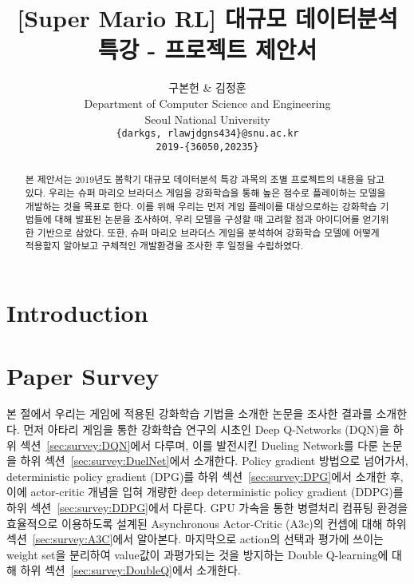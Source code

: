 \documentclass[10pt]{article}
\begin{document}
\title{[Super Mario RL] 대규모 데이터분석 특강 - 프로젝트 제안서}

\author{
구본헌 \& 김정훈\\
Department of Computer Science and Engineering\\
Seoul National University\\
\texttt{\{darkgs, rlawjdgns434\}@snu.ac.kr}\\
\texttt{2019-\{36050,20235\}}\\
}

\renewcommand{\baselinestretch}{1.25}

\maketitle
\begin{abstract}
본 제안서는 2019년도 봄학기 대규모 데이터분석 특강 과목의 조별 프로젝트의 내용을 담고 있다.
우리는 슈퍼 마리오 브라더스 게임을 강화학습을 통해 높은 점수로 플레이하는 모델을 개발하는 것을 목표로 한다.
이를 위해 우리는 먼저 게임 플레이를 대상으로하는 강화학습 기법들에 대해 발표된 논문을 조사하여, 우리 모델을 구성할 때 고려할 점과 아이디어를 얻기위한 기반으로 삼았다.
또한, 슈퍼 마리오 브라더스 게임을 분석하여 강화학습 모델에 어떻게 적용할지 알아보고 구체적인 개발환경을 조사한 후 일정을 수립하였다.
\end{abstract}



\section{Introduction}
\label{sec:intro}


\section{Paper Survey}
본 절에서 우리는 게임에 적용된 강화학습 기법을 소개한 논문을 조사한 결과를 소개한다.
먼저 아타리 게임을 통한 강화학습 연구의 시초인 Deep Q-Networks (DQN)을 하위 섹션~\ref{sec:survey:DQN}에서 다루며, 이를 발전시킨 Dueling Network를 다룬 논문을 하위 섹션~\ref{sec:survey:DuelNet}에서 소개한다.
Policy gradient 방법으로 넘어가서, deterministic policy gradient (DPG)를 하위 섹션~\ref{sec:survey:DPG}에서 소개한 후,
이에 actor-critic 개념을 입혀 개량한 deep deterministic policy gradient (DDPG)를 하위 섹션~\ref{sec:survey:DDPG}에서 다룬다.
GPU 가속을 통한 병렬처리 컴퓨팅 환경을 효율적으로 이용하도록 설계된 Asynchronous Actor-Critic (A3c)의 컨셉에 대해 하위 섹션~\ref{sec:survey:A3C}에서 알아본다.
마지막으로 action의 선택과 평가에 쓰이는 weight set을 분리하여 value값이 과평가되는 것을 방지하는 Double Q-learning에 대해 하위 섹션~\ref{sec:survey:DoubleQ}에서 소개한다.
\label{sec:survey}






\end{document}
